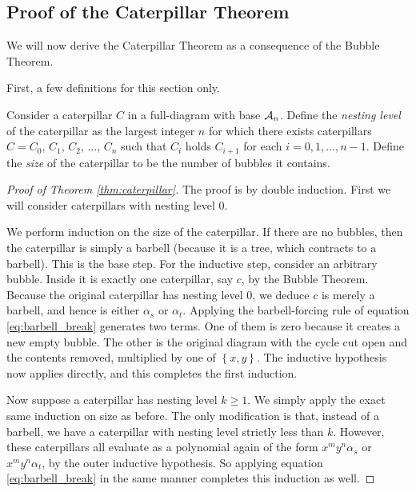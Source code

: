 \subsection{Proof of the Caterpillar Theorem}
We will now derive the Caterpillar Theorem as a consequence of the Bubble Theorem.  

First, a few definitions for this section only.
\begin{definition*}
	Consider a caterpillar $C$ in a full-diagram with base $\AA_n$.  Define the \emph{nesting level} of the caterpillar as the largest integer $n$ for which there exists caterpillars $C = C_0$, $C_1$, $C_2$, $\dots$, $C_n$ such that $C_i$ holds $C_{i+1}$ for each $i=0,1,\dots,n-1$.  Define the \emph{size} of the caterpillar to be the number of bubbles it contains.
\end{definition*}

\begin{proof}[Proof of Theorem \ref{thm:caterpillar}]
	The proof is by double induction.  First we will consider caterpillars with nesting level $0$.  

	We perform induction on the size of the caterpillar. 
	If there are no bubbles, then the caterpillar is simply a barbell (because it is a tree, which contracts to a barbell).
	This is the base step.
	For the inductive step, consider an arbitrary bubble.  Inside it is exactly one caterpillar, say $c$, by the Bubble Theorem.  Because the original caterpillar has nesting level $0$, we deduce $c$ is merely a barbell, and hence is either $\alpha_s$ or $\alpha_t$.
	Applying the barbell-forcing rule of equation \eqref{eq:barbell_break} generates two terms.  One of them is zero because it creates a new empty bubble. The other is the original diagram with the cycle cut open and the contents removed, multiplied by one of $\left\{ x,y \right\}$.  The inductive hypothesis now applies directly, and this completes the first induction.

	Now suppose a caterpillar has nesting level $k \ge 1$.  We simply apply the exact same induction on size as before.  The only modification is that, instead of a barbell, we have a caterpillar with nesting level strictly less than $k$.  However, these caterpillars all evaluate as a polynomial again of the form $x^my^n \alpha_s$ or $x^my^n\alpha_t$, by the outer inductive hypothesis.  So applying equation \eqref{eq:barbell_break} in the same manner completes this induction as well.
\end{proof}

